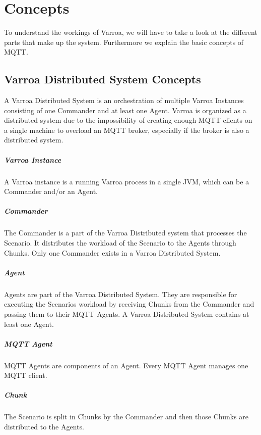 \chapter{Concepts}
To understand the workings of Varroa, we will have to take a look at the different parts that make up the system.
Furthermore we explain the basic concepts of MQTT.

\section{Varroa Distributed System Concepts}
A Varroa Distributed System is an orchestration of multiple Varroa Instances consisting of one Commander and at least one Agent.
Varroa is organized as a distributed system due to the impossibility of creating enough MQTT clients on a single machine to overload an MQTT broker, especially if the broker is also a distributed system.

\paragraph{Varroa Instance}
A Varroa instance is a running Varroa process in a single JVM, which can be a Commander and/or an Agent.

\paragraph{Commander}
The Commander is a part of the Varroa Distributed system that processes the Scenario.
It distributes the workload of the Scenario to the Agents through Chunks.
Only one Commander exists in a Varroa Distributed System.

\paragraph{Agent}
Agents are part of the Varroa Distributed System.
They are responsible for executing the Scenarios workload by receiving Chunks from the Commander and passing them to their MQTT Agents.
A Varroa Distributed System contains at least one Agent.

\paragraph{MQTT Agent}
MQTT Agents are components of an Agent.
Every MQTT Agent manages one MQTT client.

\paragraph{Chunk}
The Scenario is split in Chunks by the Commander and then those Chunks are distributed to the Agents.


